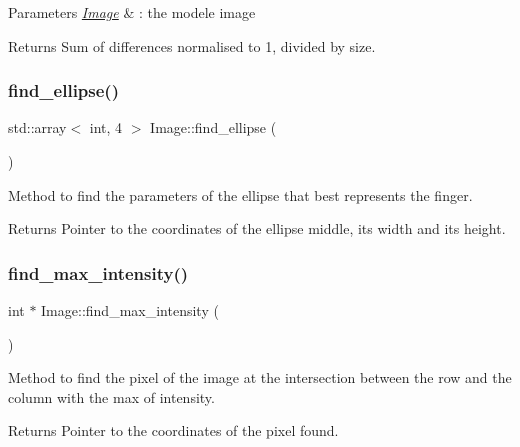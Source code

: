 \begin{DoxyParams}{Parameters}
{\em \hyperlink{class_image}{Image}} & \+: the modele image \\
\hline
\end{DoxyParams}
\begin{DoxyReturn}{Returns}
Sum of differences normalised to 1, divided by size. 
\end{DoxyReturn}
\mbox{\label{class_image_aa85eb23026300e759e763ce312464632}} 
\subsubsection{\texorpdfstring{find\+\_\+ellipse()}{find\_ellipse()}}
{\footnotesize\ttfamily std\+::array$<$ int, 4 $>$ Image\+::find\+\_\+ellipse (\begin{DoxyParamCaption}{ }\end{DoxyParamCaption})}



Method to find the parameters of the ellipse that best represents the finger. 

\begin{DoxyReturn}{Returns}
Pointer to the coordinates of the ellipse middle, its width and its height. 
\end{DoxyReturn}
\mbox{\label{class_image_aebad8aed02315ffc5df4ec774b9b960d}} 
\subsubsection{\texorpdfstring{find\+\_\+max\+\_\+intensity()}{find\_max\_intensity()}}
{\footnotesize\ttfamily int $\ast$ Image\+::find\+\_\+max\+\_\+intensity (\begin{DoxyParamCaption}{ }\end{DoxyParamCaption})}



Method to find the pixel of the image at the intersection between the row and the column with the max of intensity. 

\begin{DoxyReturn}{Returns}
Pointer to the coordinates of the pixel found. 
\end{DoxyReturn}
\mbox{\label{class_image_a2a9c42c15f6d5c6ecf6bc921169b9579}} 
